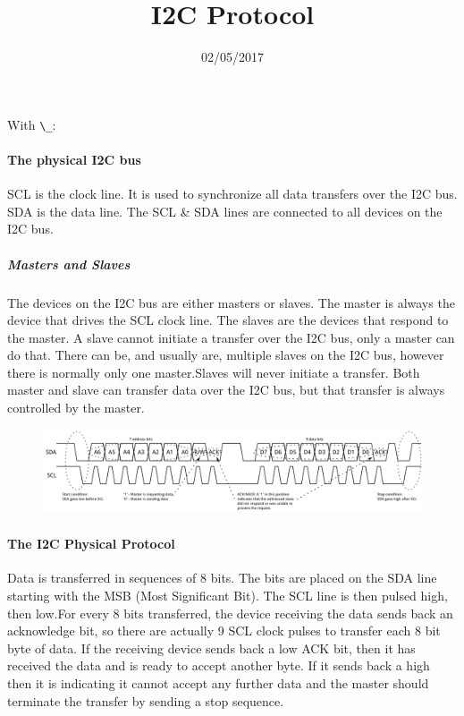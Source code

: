 \documentclass[10pt,twocolumn]{IEEEtran}
\title{I2C Protocol}
\date{02/05/2017}
\begin{document}
  With \verb!\_!:
  \maketitle
   \paragraph{The physical I2C bus}
\newline
SCL is the clock line. It is used to synchronize all data transfers over the I2C bus. SDA is the data line. The SCL & SDA lines are connected to all devices on the I2C bus.

\subparagraph{Masters and Slaves}
\newline
The devices on the I2C bus are either masters or slaves. The master is always the device that drives the SCL clock line. The slaves are the devices that respond to the master. A slave cannot initiate a transfer over the I2C bus, only a master can do that. There can be, and usually are, multiple slaves on the I2C bus, however there is normally only one master.Slaves will never initiate a transfer. Both master and slave can transfer data over the I2C bus, but that transfer is always controlled by the master.

\begin{figure}[p][t]
  \includegraphics[width=\textwidth]{i2c_concept.png}
  \label{Figure 1: The I2C protocol}
\end{figure}


\paragraph{The I2C Physical Protocol}
\newline
Data is transferred in sequences of 8 bits. The bits are placed on the SDA line starting with the MSB (Most Significant Bit). The SCL line is then pulsed high, then low.For every 8 bits transferred, the device receiving the data sends back an acknowledge bit, so there are actually 9 SCL clock pulses to transfer each 8 bit byte of data. If the receiving device sends back a low ACK bit, then it has received the data and is ready to accept another byte. If it sends back a high then it is indicating it cannot accept any further data and the master should terminate the transfer by sending a stop sequence. 
\end{document}
